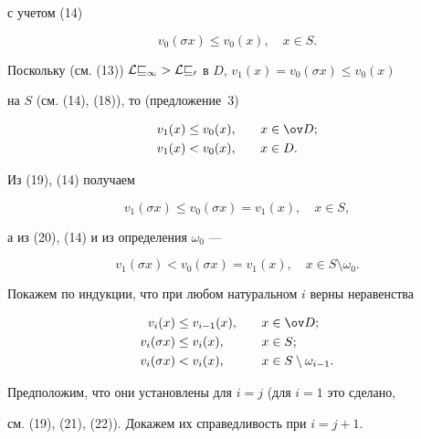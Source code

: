 с учетом (14) 


\begin{equation} 


v_0(\sigma x)\le v_0(x),\quad x\in S. 


\end{equation} 


Поскольку (см. (13)) $\cal L v_1>\cal L v_0$ в $D$, $v_1(x)=v_0(\sigma 


x)\le v_0(x)$ 


на $S$ (см. (14), (18)), то (предложение~3) 


\begin{alignat}{2} 


v_1(x)&\le v_0(x), &\quad &x\in\ov D;\\ 


v_1(x)&<v_0(x), &\quad &x\in D. 


\end{alignat} 


Из (19), (14) получаем 


\begin{equation} 


v_1(\sigma x)\le v_0(\sigma x)=v_1(x),\quad x\in S, 


\end{equation} 


а из (20), (14) и из определения $\omega_0$ --- 


\begin{equation} 


v_1(\sigma x)<v_0(\sigma x)=v_1(x),\quad x\in S\setminus\omega_0. 


\end{equation} 


Покажем по индукции, что при любом натуральном $i$ верны неравенства 


\begin{alignat}{2} 


v_i(x)&\le v_{i-1}(x), &\quad &x\in\ov D;\\ 


v_i(\sigma x)&\le v_i(x), &\quad & x\in S;\\ 


v_i(\sigma x)&<v_i(x), &\quad &x\in S\setminus\omega_{i-1}. 


\end{alignat} 


Предположим, что они установлены для $i=j$ (для $i=1$ это сделано,


см. (19), (21), (22)). Докажем их справедливость при $i=j+1$. 



